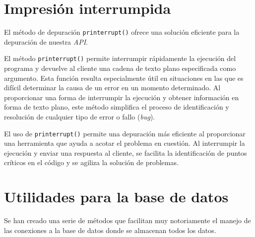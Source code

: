 \documentclass[12pt]{report}
\begin{document}
\section{Impresión interrumpida}
El método de depuración \texttt{printerrupt()} ofrece una solución eficiente para la depuración de nuestra \textit{API}.

El método \texttt{printerrupt()} permite interrumpir rápidamente la ejecución del programa y devuelve al cliente una cadena de texto plano especificada como argumento. Esta función resulta especialmente útil en situaciones en las que es difícil determinar la causa de un error en un momento determinado. Al proporcionar una forma de interrumpir la ejecución y obtener información en forma de texto plano, este método simplifica el proceso de identificación y resolución de cualquier tipo de error o fallo (\emph{bug}).

El uso de \texttt{printerrupt()} permite una depuración más eficiente al proporcionar una herramienta que ayuda a acotar el problema en cuestión. Al interrumpir la ejecución y enviar una respuesta al cliente, se facilita la identificación de puntos críticos en el código y se agiliza la solución de problemas.
\section{Utilidades para la base de datos}
Se han creado una serie de métodos que facilitan muy notoriamente el manejo de las conexiones a la base de datos donde se almacenan todos los datos.
\end{document}
